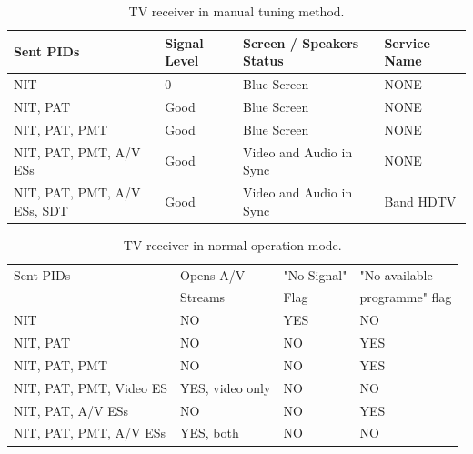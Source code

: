 \documentclass[
	12pt,				%
	openright,			%
	twoside,			%
	a4paper,			%
	brazil,
	french,				%
	english
	]{abntex2}
\begin{document}
\begin{table}
    \caption {TV receiver in manual tuning method.}
    \begin{center}
\begin{tabular}{|l|l|l|l|}
    \hline
    Sent PIDs                   & Signal Level & Screen / Speakers Status & Service Name \\ \hline
    NIT                         & 0            & Blue Screen              & NONE         \\ \hline
    NIT, PAT                    & Good         & Blue Screen              & NONE         \\ \hline
    NIT, PAT, PMT               & Good         & Blue Screen              & NONE         \\ \hline
    NIT, PAT, PMT, A/V ESs      & Good         & Video and Audio in Sync  & NONE         \\ \hline
    NIT, PAT, PMT, A/V ESs, SDT & Good         & Video and Audio in Sync  & Band HDTV    \\ \hline
    \end{tabular}
	\label{tab_manual_tuning}
\end{center}

\end{table}

\begin{table}
    \caption {TV receiver in normal operation mode.}
    \begin{center}
\begin{tabular}{|l|l|l|l|}
    \hline
    Sent PIDs               & Opens A/V & "No Signal" & "No available \\
                   & Streams & Flag & programme" flag \\ \hline
    NIT                     & NO                & YES              & NO                            \\ \hline
    NIT, PAT                & NO                & NO               & YES                           \\ \hline
    NIT, PAT, PMT           & NO                & NO               & YES                           \\ \hline
    NIT, PAT, PMT, Video ES & YES, video only   & NO               & NO                            \\ \hline
    NIT, PAT, A/V ESs  & NO         & NO               & YES                            \\ \hline
	NIT, PAT, PMT, A/V ESs  & YES, both         & NO               & NO                            \\ \hline
    \end{tabular}
	\label{tab_normal_operation}
\end{center}
\end{table}
\end{document}
